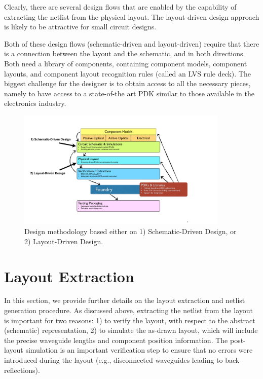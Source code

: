\documentclass[journal]{spie}
\begin{document}
Clearly, there are several design flows that are enabled by the capability of extracting the netlist from the physical layout.  The layout-driven design approach is likely to be attractive for small circuit designs.


Both of these design flows (schematic-driven and layout-driven) require that there is a connection between the layout and the schematic, and in both directions.  Both need a library of components, containing component models, component layouts, and component layout recognition rules (called an LVS rule deck).  The biggest challenge for the designer is to obtain access to all the necessary pieces, namely to have access to a state-of-the art PDK similar to those available in the electronics industry.  


\begin{figure}[tbp]
	\centering
	\includegraphics[width=0.9\textwidth]{../figs_paper/SDDvsLDD.pdf}
    \caption[]{Design methodology based either on 1) Schematic-Driven Design, or 2) Layout-Driven Design.}
    \label{SDDvsLDD}
\end{figure}


\section{Layout Extraction}

In this section, we provide further details on the layout extraction and netlist generation procedure.  
As discussed above, extracting the netlist from the layout is important for two reasons: 1) to verify the layout, with respect to the abstract (schematic) representation, 2) to simulate the as-drawn layout, which will include the precise waveguide lengths and component position information.  The post-layout simulation is an important verification step to ensure that no errors were introduced during the layout (e.g., disconnected waveguides leading to back-reflections).
\end{document}
